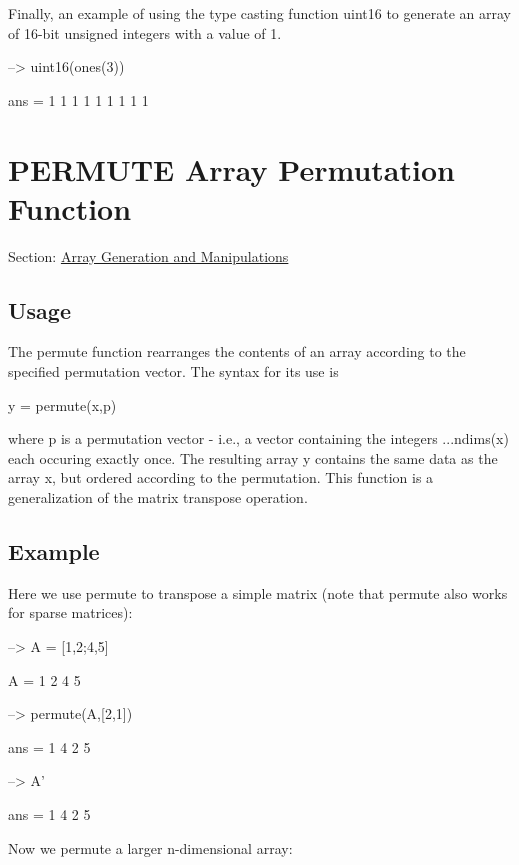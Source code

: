 Finally, an example of using the type casting function {\ttfamily uint16} to generate an array of 16-\/bit unsigned integers with a value of 1.


\begin{DoxyVerbInclude}
--> uint16(ones(3))

ans = 
 1 1 1 
 1 1 1 
 1 1 1 
\end{DoxyVerbInclude}
 \hypertarget{array_permute}{}\section{P\-E\-R\-M\-U\-T\-E Array Permutation Function}\label{array_permute}
Section\-: \hyperlink{sec_array}{Array Generation and Manipulations} \hypertarget{vtkwidgets_vtkxyplotwidget_Usage}{}\subsection{Usage}\label{vtkwidgets_vtkxyplotwidget_Usage}
The {\ttfamily permute} function rearranges the contents of an array according to the specified permutation vector. The syntax for its use is \begin{DoxyVerb}    y = permute(x,p)
\end{DoxyVerb}
 where {\ttfamily p} is a permutation vector -\/ i.\-e., a vector containing the integers {...ndims(x)} each occuring exactly once. The resulting array {\ttfamily y} contains the same data as the array {\ttfamily x}, but ordered according to the permutation. This function is a generalization of the matrix transpose operation. \hypertarget{variables_struct_Example}{}\subsection{Example}\label{variables_struct_Example}
Here we use {\ttfamily permute} to transpose a simple matrix (note that permute also works for sparse matrices)\-:


\begin{DoxyVerbInclude}
--> A = [1,2;4,5]

A = 
 1 2 
 4 5 

--> permute(A,[2,1])

ans = 
 1 4 
 2 5 

--> A'

ans = 
 1 4 
 2 5 
\end{DoxyVerbInclude}


Now we permute a larger n-\/dimensional array\-:


